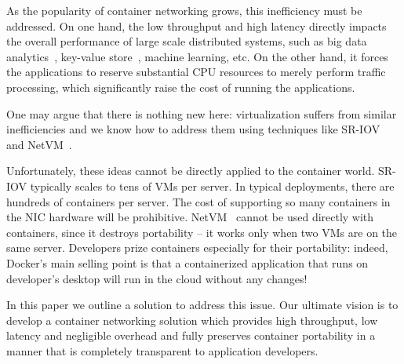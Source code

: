 As the popularity of container networking grows, this inefficiency must be
addressed. On one hand, the low throughput and high latency directly impacts
the overall performance of large scale distributed systems, such as big data
analytics~\cite{choudhury-paper,mapreduce}, key-value store~\cite{farm,cassandra,bigtable}, machine learning,
etc.  On the other hand, it forces the applications to reserve substantial CPU
resources to merely perform traffic processing, which significantly raise the
cost of running the applications.

One may argue that there is nothing new here: virtualization suffers from
similar inefficiencies and we know how to address them using techniques like
SR-IOV~\cite{sriov} and NetVM~\cite{netvm}.

Unfortunately, these ideas cannot be directly applied to the container world.
SR-IOV typically scales to tens of VMs per server. In typical deployments, there
are hundreds of containers per server. The cost of supporting so many containers
in the NIC hardware will be prohibitive.  NetVM~\cite{netvm} cannot be used
directly with containers, since it destroys portability -- it works only when
two VMs are on the same server.  Developers prize containers especially for
their portability: indeed, Docker's main selling point is that a containerized
application that runs on developer's desktop will run in the cloud without any
changes! 


In this paper we outline a solution to address this issue.  Our ultimate vision
is to develop a container networking solution which provides high throughput,
low latency and negligible overhead and fully preserves container portability in
a manner that is completely transparent to application developers. 

